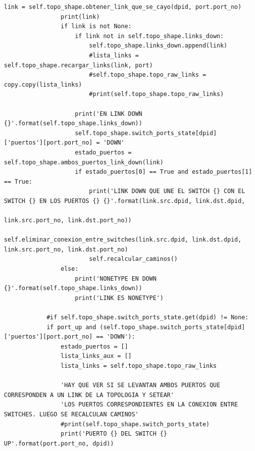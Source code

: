 \documentclass[12pt,a4paper,oneside]{book}
\begin{document}
\begin{lstlisting}[style=codigobase,  label = cod_correrP, caption= controlador.py]
                link = self.topo_shape.obtener_link_que_se_cayo(dpid, port.port_no)
                print(link)
                if link is not None:
                    if link not in self.topo_shape.links_down:
                        self.topo_shape.links_down.append(link)
                        #lista_links = self.topo_shape.recargar_links(link, port)
                        #self.topo_shape.topo_raw_links = copy.copy(lista_links)
                        #print(self.topo_shape.topo_raw_links)

                    print('EN LINK DOWN {}'.format(self.topo_shape.links_down))
                    self.topo_shape.switch_ports_state[dpid]['puertos'][port.port_no] = 'DOWN'
                    estado_puertos = self.topo_shape.ambos_puertos_link_down(link)
                    if estado_puertos[0] == True and estado_puertos[1] == True:
                        print('LINK DOWN QUE UNE EL SWITCH {} CON EL SWITCH {} EN LOS PUERTOS {} {}'.format(link.src.dpid, link.dst.dpid,
                                                                                                            link.src.port_no, link.dst.port_no))
                        self.eliminar_conexion_entre_switches(link.src.dpid, link.dst.dpid, link.src.port_no, link.dst.port_no)
                        self.recalcular_caminos()
                else:
                    print('NONETYPE EN DOWN {}'.format(self.topo_shape.links_down))
                    print('LINK ES NONETYPE')

            #if self.topo_shape.switch_ports_state.get(dpid) != None:
            if port_up and (self.topo_shape.switch_ports_state[dpid]['puertos'][port.port_no] == 'DOWN'):
                estado_puertos = []
                lista_links_aux = []
                lista_links = self.topo_shape.topo_raw_links

                'HAY QUE VER SI SE LEVANTAN AMBOS PUERTOS QUE CORRESPONDEN A UN LINK DE LA TOPOLOGIA Y SETEAR'
                'LOS PUERTOS CORRESPONDIENTES EN LA CONEXION ENTRE SWITCHES. LUEGO SE RECALCULAN CAMINOS'
                #print(self.topo_shape.switch_ports_state)
                print('PUERTO {} DEL SWITCH {} UP'.format(port.port_no, dpid))


\end{lstlisting}
\end{document}
